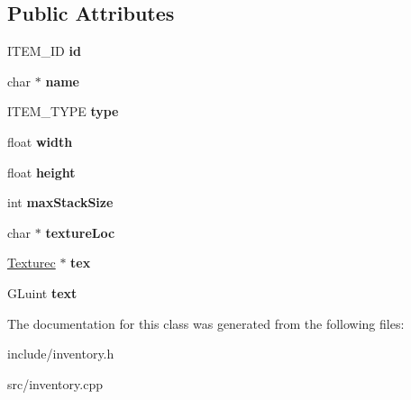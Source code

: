 \subsection*{Public Attributes}
\begin{DoxyCompactItemize}
\item 
\hypertarget{classItem_ae16ef760610988c396ff963c2fb486b3}{}I\+T\+E\+M\+\_\+\+I\+D {\bfseries id}\label{classItem_ae16ef760610988c396ff963c2fb486b3}

\item 
\hypertarget{classItem_a06c6faeee0e8202db92886ea8a4472d7}{}char $\ast$ {\bfseries name}\label{classItem_a06c6faeee0e8202db92886ea8a4472d7}

\item 
\hypertarget{classItem_af59b9c75c68c7369ba8992b4a7ac5414}{}I\+T\+E\+M\+\_\+\+T\+Y\+P\+E {\bfseries type}\label{classItem_af59b9c75c68c7369ba8992b4a7ac5414}

\item 
\hypertarget{classItem_a7a444a25dab3814f4c275a44da0ca198}{}float {\bfseries width}\label{classItem_a7a444a25dab3814f4c275a44da0ca198}

\item 
\hypertarget{classItem_a936834d805f6c53630f84dae5765108c}{}float {\bfseries height}\label{classItem_a936834d805f6c53630f84dae5765108c}

\item 
\hypertarget{classItem_a21048ebf5f1893ed429657863c622288}{}int {\bfseries max\+Stack\+Size}\label{classItem_a21048ebf5f1893ed429657863c622288}

\item 
\hypertarget{classItem_a54244d0dc976bc28d091cec66163cd49}{}char $\ast$ {\bfseries texture\+Loc}\label{classItem_a54244d0dc976bc28d091cec66163cd49}

\item 
\hypertarget{classItem_ab457f6ac62ff7d7d593992e70cd7b8d3}{}\hyperlink{classTexturec}{Texturec} $\ast$ {\bfseries tex}\label{classItem_ab457f6ac62ff7d7d593992e70cd7b8d3}

\item 
\hypertarget{classItem_a059046326e4a17610ea4e39f342957d8}{}G\+Luint {\bfseries text}\label{classItem_a059046326e4a17610ea4e39f342957d8}

\end{DoxyCompactItemize}


The documentation for this class was generated from the following files\+:\begin{DoxyCompactItemize}
\item 
include/inventory.\+h\item 
src/inventory.\+cpp\end{DoxyCompactItemize}

